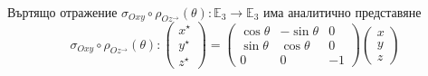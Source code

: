 \documentclass[12pt]{article}
\begin{document}
\\
\begin{tcolorbox}[
    colback=blue!5,    %
    colframe=blue!75!black, %
    title={\textbf{Твърдение 27:}}, %
    fonttitle=\bfseries,
    boxrule=0.8pt,
    arc=1mm,           %
    top=2mm, bottom=2mm, left=3mm, right=3mm
] Въртящо отражение $\sigma_{Oxy}\circ\rho_{Oz^{\rightarrow}}(\theta):\mathbb{E}_3\to\mathbb{E}_3$ има аналитично представяне $$\sigma_{Oxy}\circ\rho_{Oz^{\rightarrow}}(\theta):\begin{pmatrix} x^\star \\ y^\star\\ z^\star\end{pmatrix}=\begin{pmatrix} \cos\theta & -\sin\theta & 0 \\ \sin\theta & \cos\theta & 0 \\ 0 & 0 & -1\end{pmatrix}\begin{pmatrix} x\\ y\\ z\end{pmatrix}$$
\end{tcolorbox}
\end{document}
